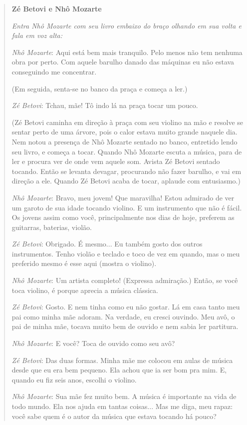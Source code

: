 \begin{boxlist}
\begin{quote}
\textbf{Zé Betovi e Nhô Mozarte}

\textit{Entra Nhô Mozarte com seu livro embaixo do braço olhando em
sua volta e fala em voz alta:}

\emph{Nhô Mozarte}: Aqui está bem mais tranquilo. Pelo menos não tem
nenhuma obra por perto. Com aquele barulho danado das máquinas eu não
estava conseguindo me concentrar.

(Em seguida, senta-se no banco da praça e começa a ler.)

\emph{Zé Betovi}: Tchau, mãe! Tô indo lá na praça tocar um pouco.

(Zé Betovi caminha em
direção à praça com seu violino na mão e resolve se sentar perto de uma
árvore, pois o calor estava muito grande naquele dia. Nem notou a
presença de Nhô Mozarte sentado no banco, entretido lendo seu livro, e
começa a tocar. Quando Nhô Mozarte escuta a música, para de ler e
procura ver de onde vem aquele som. Avista Zé Betovi sentado tocando.
Então se levanta devagar, procurando não fazer barulho, e vai em direção
a ele. Quando Zé Betovi acaba de tocar, aplaude com entusiasmo.)

\emph{Nhô Mozarte}: Bravo, meu jovem! Que maravilha! Estou admirado de
ver um garoto de sua idade tocando violino. E um instrumento que não é
fácil. Os jovens assim como você, principalmente nos dias de hoje,
preferem as guitarras, baterias, violão.

\emph{Zé Betovi}: Obrigado. É mesmo... Eu também gosto dos outros
instrumentos. Tenho violão e teclado e toco de vez em quando, mas o meu
preferido mesmo é esse aqui (mostra o violino).

\emph{Nhô Mozarte}: Um artista completo! (Expressa admiração.) Então, se
você toca violino, é porque aprecia a música clássica.

\emph{Zé Betovi}: Gosto. E nem tinha como eu não gostar. Lá em casa
tanto meu pai como minha mãe adoram. Na verdade, eu cresci ouvindo. Meu
avô, o pai de minha mãe, tocava muito bem de ouvido e nem sabia ler
partitura.

\emph{Nhô Mozarte}: E você? Toca de ouvido como seu avô?

\emph{Zé Betovi}: Das duas formas. Minha mãe me colocou em aulas de
música desde que eu era bem pequeno. Ela achou que ia ser bom pra mim.
E, quando eu fiz seis anos, escolhi o violino.

\emph{Nhô Mozarte}: Sua mãe fez muito bem. A música é importante na vida
de todo mundo. Ela nos ajuda em tantas coisas... Mas me diga, meu rapaz:
você sabe quem é o autor da música que estava tocando há pouco?


\end{quote}
\end{boxlist}
